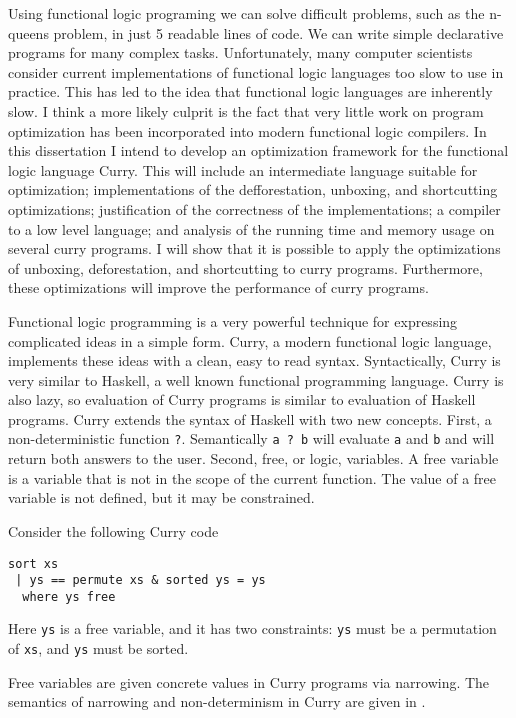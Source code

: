 
Using functional logic programing we can solve difficult problems, such as the n-queens problem, in
just 5 readable lines of code.
We can write simple declarative programs for many complex tasks.
Unfortunately, many computer scientists consider current implementations of functional logic languages
too slow to use in practice.
This has led to the idea that functional logic languages are inherently slow.
I think a more likely culprit is the fact that very little work on program optimization 
has been incorporated into modern functional logic compilers.
In this dissertation I intend to develop an optimization framework for the functional logic language Curry.
This will include an intermediate language suitable for optimization;
implementations of the defforestation, unboxing, and shortcutting optimizations;
justification of the correctness of the implementations;
a compiler to a low level language;
and analysis of the running time and memory usage on several curry programs.
I will show that it is possible to apply the optimizations of unboxing, deforestation, and shortcutting to curry programs.
Furthermore, these optimizations will improve the performance of curry programs.

Functional logic programming is a very powerful technique for expressing complicated ideas in a simple form.
Curry, a modern functional logic language, implements these ideas with a clean, easy to read syntax.
Syntactically, Curry is very similar to Haskell, a well known functional programming language.
Curry is also lazy, so evaluation of Curry programs is similar to evaluation of Haskell programs.
Curry extends the syntax of Haskell with two new concepts.
First, a non-deterministic function \texttt{?}.  
Semantically \texttt{a ? b} will evaluate \texttt{a} and \texttt{b} and will return both answers to the user.
Second, free, or logic, variables.
A free variable is a variable that is not in the scope of the current function.
The value of a free variable is not defined, but it may be constrained.

Consider the following Curry code
\begin{verbatim}
sort xs
 | ys == permute xs & sorted ys = ys
  where ys free
\end{verbatim}
Here \texttt{ys} is a free variable, and it has two constraints:
\texttt{ys} must be a permutation of \texttt{xs}, and \texttt{ys} must be sorted.

Free variables are given concrete values in Curry programs via narrowing.
The semantics of narrowing and non-determinism in Curry are given in \cite{Hanus16Curry, AntoyHanus06ICLP}.

